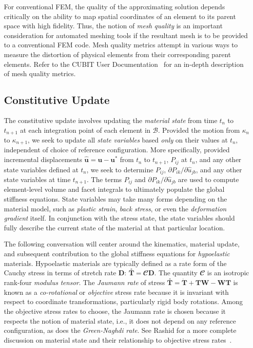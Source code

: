 For conventional FEM, the quality of the approximating solution depends critically on the ability to map spatial coordinates of an element to its parent space with high fidelity. Thus, the notion of \textit{mesh quality} is an important consideration for automated meshing tools if the resultant mesh is to be provided to a conventional FEM code. Mesh quality metrics attempt in various ways to measure the distortion of physical elements from their corresponding parent elements. Refer to the CUBIT User Documentation~\cite{cubit_2018} for an in-depth description of mesh quality metrics.

\subsection{Constitutive Update}

The constitutive update involves updating the \textit{material state} from time $t_n$ to $t_{n+1}$ at each integration point of each element in $\mathcal{B}$. Provided the motion from $\kappa_n$ to $\kappa_{n+1}$, we seek to update all \textit{state variables} based \textit{only} on their values at $t_n$, independent of choice of reference configuration. More specifically, provided incremental displacements $\hat{\bm{u}} = \bm{u} - \bm{u}^*$ from $t_n$ to $t_{n+1}$, $P_{ij}$ at $t_n$, and any other state variables defined at $t_n$, we seek to determine $P_{ij}$, $\partial{P_{ik}}/\partial{\hat{u}_{jb}}$, and any other state variables at time $t_{n+1}$. The terms $P_{ij}$ and $\partial{P_{ik}}/\partial{\hat{u}_{jb}}$ are used to compute element-level volume and facet integrals to ultimately populate the global stiffness equations. State variables may take many forms depending on the material model, such as \textit{plastic strain}, \textit{back stress}, or even the \textit{deformation gradient} itself. In conjunction with the stress state, the state variables should fully describe the current state of the material at that particular location.

The following conversation will center around the kinematics, material update, and subsequent contribution to the global stiffness equations for \textit{hypoelastic} materials. Hypoelastic materials are typically defined as a rate form of the Cauchy stress in terms of stretch rate $\bm{D}$: $\overset{\circ}{\bm{T}} =  {\mathbfcal{C}}\bm{D}$. The quantity ${\mathbfcal{C}}$ is an isotropic rank-four \textit{modulus tensor}. The \textit{Jaumann rate} of stress $\overset{\circ}{\bm{T}} = \dot{\bm{T}} + \bm{T}\bm{W} - \bm{W}\bm{T}$ is known as a \textit{co-rotational} or \textit{objective} stress rate because it is invariant with respect to coordinate transformations, particularly rigid body rotations. Among the objective stress rates to choose, the Jaumann rate is chosen because it respects the notion of material state, i.e., it does not depend on any reference configuration, as does the \textit{Green-Naghdi rate}. See Rashid for a more complete discussion on material state and their relationship to objective stress rates~\cite{rashid_1991}.

